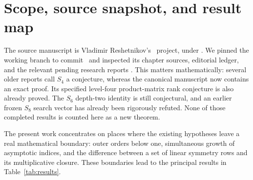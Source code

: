\section{Scope, source snapshot, and result map}
\label{sec:scope}

The source manuscript is Vladimir Reshetnikov's \repo\ project,
under . We pinned the
working branch to commit \baseline\ and inspected its chapter sources,
editorial ledger, and the relevant pending research reports
\cite{ProveIt,AngularBaseline,LerchBaseline,CayleyBaseline}.
This matters mathematically: several older reports call $S_4$ a conjecture,
whereas the canonical manuscript now contains an exact proof. Its
specified level-four product-matrix rank conjecture is also already
proved. The $S_6$ depth-two identity is still conjectural, and an earlier
frozen $S_8$ search vector has already been rigorously refuted. None of
those completed results is counted here as a new theorem.

The present work concentrates on places where the existing hypotheses
leave a real mathematical boundary: outer orders below one, simultaneous
growth of asymptotic indices, and the difference between a set of
linear symmetry rows and its multiplicative closure. These boundaries
lead to the principal results in Table~\ref{tab:results}.

